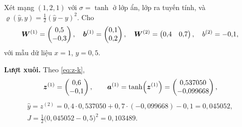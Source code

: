 \begin{vidu}
\label{vd:backprop-numeric}
Xét mạng $(1,2,1)$ với $\sigma = \tanh$ ở lớp ẩn, lớp ra tuyến tính, và
$\varrho(\hat y, y) = \tfrac{1}{2}(\hat{y}-y)^2$. Cho
\[
\bm{W}^{(1)} = \begin{pmatrix} 0{,}5 \\ -0{,}3 \end{pmatrix},\quad
\bm{b}^{(1)} = \begin{pmatrix} 0{,}1 \\ 0{,}2 \end{pmatrix},\quad
\bm{W}^{(2)} = \begin{pmatrix} 0{,}4 & 0{,}7 \end{pmatrix},\quad
b^{(2)} = -0{,}1,
\]
với mẫu dữ liệu $x = 1$, $y = 0{,}5$.
 
\smallskip
\noindent\textbf{Lượt xuôi.} Theo \eqref{eq:z-k},
\[
\bm{z}^{(1)} = \begin{pmatrix} 0{,}6 \\ -0{,}1 \end{pmatrix},
\qquad
\bm{a}^{(1)} = \tanh\!\left(\bm{z}^{(1)}\right)
= \begin{pmatrix} 0{,}537050 \\ -0{,}099668 \end{pmatrix},
\]
\begin{gather*}
\hat{y} = z^{(2)} = 0{,}4 \cdot 0{,}537050 + 0{,}7 \cdot (-0{,}099668) - 0{,}1
 = 0{,}045052, \\
J = \tfrac{1}{2}\big(0{,}045052 - 0{,}5\big)^2 = 0{,}103489 .
\end{gather*}
 

\end{vidu}
